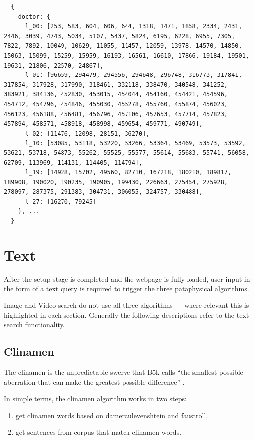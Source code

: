 \begin{verbatim}
  {
    doctor: {
      l_00: [253, 583, 604, 606, 644, 1318, 1471, 1858, 2334, 2431, 2446, 3039, 4743, 5034, 5107, 5437, 5824, 6195, 6228, 6955, 7305, 7822, 7892, 10049, 10629, 11055, 11457, 12059, 13978, 14570, 14850, 15063, 15099, 15259, 15959, 16193, 16561, 16610, 17866, 19184, 19501, 19631, 21806, 22570, 24867],
      l_01: [96659, 294479, 294556, 294648, 296748, 316773, 317841, 317854, 317928, 317990, 318461, 332118, 338470, 340548, 341252, 383921, 384136, 452830, 453015, 454044, 454160, 454421, 454596, 454712, 454796, 454846, 455030, 455278, 455760, 455874, 456023, 456123, 456188, 456481, 456796, 457106, 457653, 457714, 457823, 457894, 458571, 458918, 458998, 459654, 459771, 490749],
      l_02: [11476, 12098, 28151, 36270],
      l_10: [53085, 53118, 53220, 53266, 53364, 53469, 53573, 53592, 53621, 53718, 54873, 55262, 55525, 55577, 55614, 55683, 55741, 56058, 62709, 113969, 114131, 114405, 114794],
      l_19: [14928, 15702, 49560, 82710, 167218, 180210, 189817, 189908, 190020, 190235, 190905, 199430, 226663, 275454, 275928, 278097, 287375, 291383, 304731, 306055, 324757, 330488],
      l_27: [16270, 79245]
    }, ...
  }
\end{verbatim}


\section{Text}

After the setup stage is completed and the webpage is fully loaded, user input in the form of a text query is required to trigger the three pataphysical algorithms.

Image and Video search do not use all three algorithms --- where relevant this is highlighted in each section. Generally the following descriptions refer to the text search functionality.



\subsection{Clinamen}

The clinamen is the unpredictable swerve that Bök calls ``the smallest possible aberration that can make the greatest possible difference'' \parencite{Boek2002}.

In simple terms, the clinamen algorithm works in two steps:
\begin{enumerate}
  \item get clinamen words based on dameraulevenshtein and faustroll,
  \item get sentences from corpus that match clinamen words.
\end{enumerate}

